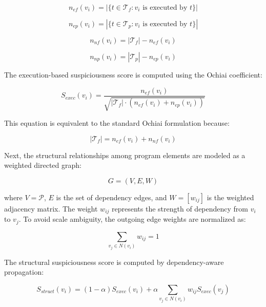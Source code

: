 \documentclass[article,article,submit,pdftex,moreauthors]{Definitions/mdpi}
\begin{document}
\begin{equation}
n_{ef}(v_i)=|\{t \in \mathcal{T}_{f}: v_i \text{ is executed by } t\}|
\end{equation}

\begin{equation}
n_{ep}(v_i)=|\{t \in \mathcal{T}_{p}: v_i \text{ is executed by } t\}|
\end{equation}

\begin{equation}
n_{nf}(v_i)=|\mathcal{T}_{f}|-n_{ef}(v_i)
\end{equation}

\begin{equation}
n_{np}(v_i)=|\mathcal{T}_{p}|-n_{ep}(v_i)
\end{equation}

The execution-based suspiciousness score is computed using the Ochiai coefficient:

\begin{equation}
S_{exec}(v_i)=
\frac{n_{ef}(v_i)}
{\sqrt{|\mathcal{T}_{f}| \cdot \left(n_{ef}(v_i)+n_{ep}(v_i)\right)}}
\end{equation}

This equation is equivalent to the standard Ochiai formulation because:

\begin{equation}
|\mathcal{T}_{f}| = n_{ef}(v_i)+n_{nf}(v_i)
\end{equation}

Next, the structural relationships among program elements are modeled as a weighted directed graph:

\begin{equation}
G=(V,E,W)
\end{equation}

where $V=\mathcal{P}$, $E$ is the set of dependency edges, and $W=[w_{ij}]$ is the weighted adjacency matrix. The weight $w_{ij}$ represents the strength of dependency from $v_i$ to $v_j$. To avoid scale ambiguity, the outgoing edge weights are normalized as:

\begin{equation}
\sum_{v_j \in N(v_i)} w_{ij}=1
\end{equation}

The structural suspiciousness score is computed by dependency-aware propagation:

\begin{equation}
S_{struct}(v_i)=
(1-\alpha)S_{exec}(v_i)
+
\alpha \sum_{v_j \in N(v_i)} w_{ij}S_{exec}(v_j)
\end{equation}
\end{document}
